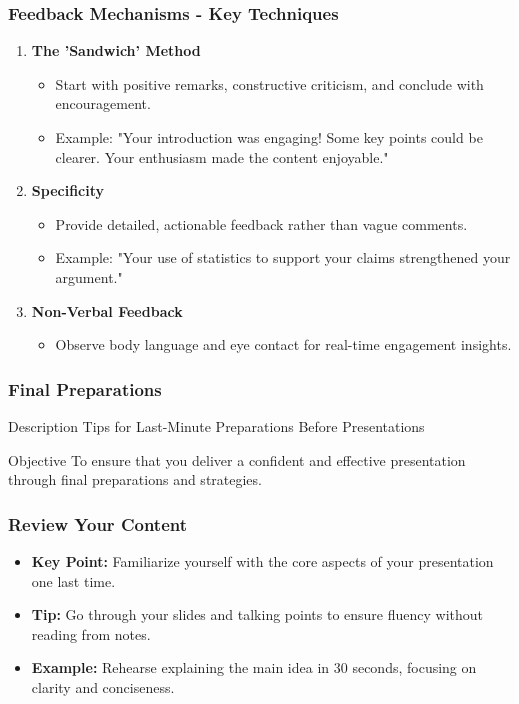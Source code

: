 \documentclass[aspectratio=169]{beamer}
\begin{document}
\begin{frame}[fragile]
  \frametitle{Feedback Mechanisms - Key Techniques}
  \begin{enumerate}
    \item \textbf{The 'Sandwich' Method}
      \begin{itemize}
        \item Start with positive remarks, constructive criticism, and conclude with encouragement.
        \item Example: "Your introduction was engaging! Some key points could be clearer. Your enthusiasm made the content enjoyable."
      \end{itemize}

    \item \textbf{Specificity}
      \begin{itemize}
        \item Provide detailed, actionable feedback rather than vague comments.
        \item Example: "Your use of statistics to support your claims strengthened your argument."
      \end{itemize}
    
    \item \textbf{Non-Verbal Feedback}
      \begin{itemize}
        \item Observe body language and eye contact for real-time engagement insights.
      \end{itemize}
  \end{enumerate}
\end{frame}

\begin{frame}[fragile]
    \frametitle{Final Preparations}
    \begin{block}{Description}
        Tips for Last-Minute Preparations Before Presentations
    \end{block}
    \begin{block}{Objective}
        To ensure that you deliver a confident and effective presentation through final preparations and strategies.
    \end{block}
\end{frame}

\begin{frame}[fragile]
    \frametitle{Review Your Content}
    \begin{itemize}
        \item \textbf{Key Point:} Familiarize yourself with the core aspects of your presentation one last time.
        \item \textbf{Tip:} Go through your slides and talking points to ensure fluency without reading from notes.
        \item \textbf{Example:} Rehearse explaining the main idea in 30 seconds, focusing on clarity and conciseness.
    \end{itemize}
\end{frame}
\end{document}
